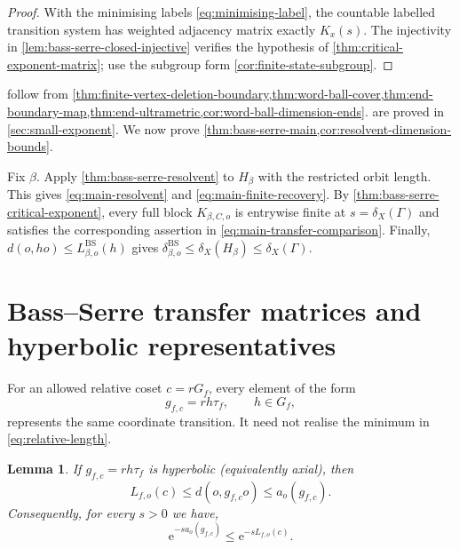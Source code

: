 \documentclass[11pt]{article}
\newtheorem{lemma}[lemma]{Lemma}
\theoremstyle{definition}
\newcommand{\BS}{\mathrm{BS}}
\newcommand{\e}{\mathrm e}
\begin{document}
\begin{proof}
With the minimising labels \eqref{eq:minimising-label}, the countable labelled transition
system has weighted adjacency matrix exactly $K_x(s)$.  The injectivity in
\cref{lem:bass-serre-closed-injective} verifies the hypothesis of
\cref{thm:critical-exponent-matrix}; use the subgroup form
\cref{cor:finite-state-subgroup}.
\end{proof}


 follow from
\cref{thm:finite-vertex-deletion-boundary,thm:word-ball-cover,thm:end-boundary-map,thm:end-ultrametric,cor:word-ball-dimension-ends}.
are proved in \cref{sec:small-exponent}.  We now prove
\cref{thm:bass-serre-main,cor:resolvent-dimension-bounds}.

Fix $\beta$.  Apply \cref{thm:bass-serre-resolvent} to
$H_\beta$ with the restricted orbit length.  This gives
\eqref{eq:main-resolvent} and \eqref{eq:main-finite-recovery}.  By
\cref{thm:bass-serre-critical-exponent}, every full block $K_{\beta,C,o}$ is entrywise finite at $s=\delta_X(\Gamma)$
and satisfies the corresponding assertion in \eqref{eq:main-transfer-comparison}.  Finally,
$d(o,ho)\le L^{\BS}_{\beta,o}(h)$ gives
$\delta^{\BS}_{\beta,o}\le\delta_X(H_\beta)\le\delta_X(\Gamma)$.
\section{Bass--Serre transfer matrices and hyperbolic representatives}
\label{sec:main-proof}

For an allowed relative coset $c=rG_f$, every element of the form
\[
 g_{f,c}=rh\tau_f,\qquad h\in G_f,
\]
represents the same coordinate transition.  It need not realise the minimum in
\eqref{eq:relative-length}.

\begin{lemma}
\label{lem:relative-axis-comparison}
If $g_{f,c}=rh\tau_f$ is hyperbolic (equivalently axial), then
\begin{equation}\label{eq:axial-relative-domination}
 L_{f,o}(c)\le d(o,g_{f,c}o)\le a_o(g_{f,c}).
\end{equation}
Consequently, for every $s>0$ we have,
\begin{equation}\label{eq:axial-weight-domination}
 \e^{-sa_o(g_{f,c})}\le\e^{-sL_{f,o}(c)}.
\end{equation}
\end{lemma}
\end{document}
